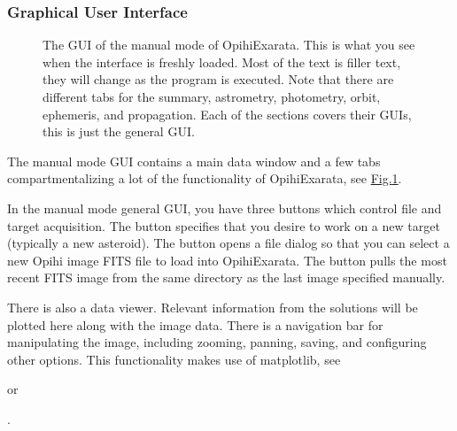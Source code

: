 \documentclass[letterpaper,11pt,english]{sphinxmanual}
\begin{document}
\subsubsection{Graphical User Interface}
\label{\detokenize{user/manual_mode:graphical-user-interface}}\label{\detokenize{user/manual_mode:user-manual-mode-graphical-user-interface}}
\begin{figure}[htbp]
\centering
\capstart

\noindent{}
\caption{The GUI of the manual mode of OpihiExarata. This is what you see when
the interface is freshly loaded. Most of the text is filler text, they will
change as the program is executed. Note that there are different tabs for
the summary, astrometry, photometry, orbit, ephemeris, and propagation.
Each of the sections covers their GUIs, this is just the general GUI.}\label{\detokenize{user/manual_mode:id2}}\label{\detokenize{user/manual_mode:figure-manual-mode-gui-all}}\end{figure}

\sphinxAtStartPar
The manual mode GUI contains a main data window and a few tabs
compartmentalizing a lot of the functionality of OpihiExarata, see
\hyperref[\detokenize{user/manual_mode:figure-manual-mode-gui-all}]{Fig.\@ \ref{\detokenize{user/manual_mode:figure-manual-mode-gui-all}}}.

\sphinxAtStartPar
In the manual mode general GUI, you have three buttons which control file
and target acquisition. The  button specifies that you desire to
work on a new target (typically a new asteroid). The 
button opens a file dialog so that you can select a new Opihi image FITS file
to load into OpihiExarata. The  button pulls the most
recent FITS image from the same directory as the last image specified manually.

\sphinxAtStartPar
There is also a data viewer. Relevant information from the solutions will be
plotted here along with the image data. There is a navigation bar for
manipulating the image, including zooming, panning, saving, and configuring
other options. This functionality makes use of matplotlib, see
%
\begin{footnote}[4]\sphinxAtStartFootnote
{}
%
\end{footnote}
or %
\begin{footnote}[5]\sphinxAtStartFootnote
{}
%
\end{footnote}.
\end{document}
